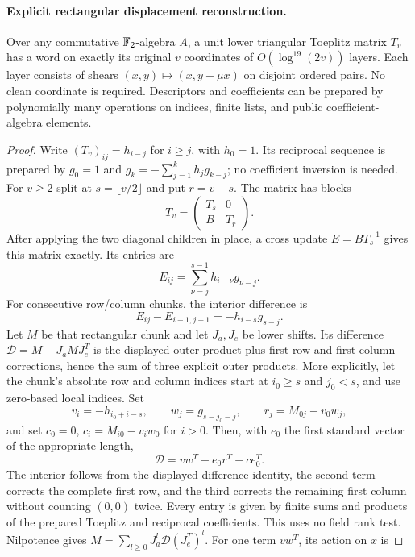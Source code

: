 \paragraph{Explicit rectangular displacement reconstruction.}
\begin{lemma}
\label{lem:exact-width-toeplitz}
Over any commutative $\mathbb F_2$-algebra $A$, a unit lower triangular
Toeplitz matrix $T_v$ has a word on exactly its original $v$ coordinates
of $O(\log^{19}(2v))$ layers. Each layer consists of shears
$(x,y)\mapsto(x,y+\mu x)$ on disjoint ordered pairs.
No clean coordinate is required. Descriptors and coefficients can be
prepared by polynomially many operations on indices, finite lists,
and public coefficient-algebra elements.
\end{lemma}
\begin{proof}
Write $(T_v)_{ij}=h_{i-j}$ for $i\ge j$, with $h_0=1$.
Its reciprocal sequence is prepared by $g_0=1$ and
$g_k=-\sum_{j=1}^k h_jg_{k-j}$; no coefficient inversion is needed.
For $v\ge2$ split at $s=\lfloor v/2\rfloor$ and put $r=v-s$.
The matrix has blocks
\[
 T_v=\begin{pmatrix}T_s&0\\B&T_r\end{pmatrix}.
\]
After applying the two diagonal children in place, a cross update
$E=BT_s^{-1}$ gives this matrix exactly. Its entries are
\[
 E_{ij}=\sum_{\nu=j}^{s-1}h_{i-\nu}g_{\nu-j}.
\]
For consecutive row/column chunks, the interior difference is
\[
 E_{ij}-E_{i-1,j-1}=-h_{i-s}g_{s-j}.
\]
Let $M$ be that rectangular chunk and let $J_a,J_e$ be lower shifts.
Its difference $\mathcal D=M-J_aMJ_e^T$ is the displayed outer
product plus first-row and first-column corrections, hence the sum
of three explicit outer products. More explicitly, let the chunk's
absolute row and column indices start at $i_0\ge s$ and $j_0<s$,
and use zero-based local indices. Set
\[
 v_i=-h_{i_0+i-s},\qquad w_j=g_{s-j_0-j},\qquad
 r_j=M_{0j}-v_0w_j,
\]
and set $c_0=0$, $c_i=M_{i0}-v_iw_0$ for $i>0$. Then, with $e_0$
the first standard vector of the appropriate length,
\[
 \mathcal D=vw^T+e_0r^T+ce_0^T.
\]
The interior follows from the displayed difference identity, the
second term corrects the complete first row, and the third corrects
the remaining first column without counting $(0,0)$ twice. Every
entry is given by finite sums and products of the prepared Toeplitz
and reciprocal coefficients. This uses no field rank test.
Nilpotence gives
$M=\sum_{l\ge0}J_a^l\mathcal D(J_e^T)^l$.
For one term $vw^T$, its action on $x$ is

\end{proof}
